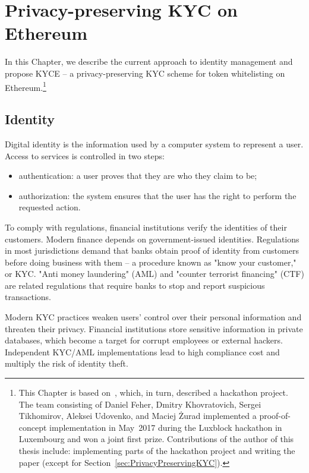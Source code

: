 \chapter{Privacy-preserving KYC on Ethereum}

\label{Chapter12KYC}

In this Chapter, we describe the current approach to identity management and propose KYCE -- a privacy-preserving KYC scheme for token whitelisting on Ethereum.\footnote{This Chapter is based on~\cite{Biryukov2018}, which, in turn, described a hackathon project. The team consisting of Daniel Feher, Dmitry Khovratovich, Sergei Tikhomirov, Aleksei Udovenko, and Maciej \.{Z}urad implemented a proof-of-concept implementation in May~2017 during the Luxblock hackathon in Luxembourg and won a joint first prize. Contributions of the author of this thesis include: implementing parts of the hackathon project and writing the paper (except for Section~\ref{sec:PrivacyPreservingKYC}).}


\section{Identity}

Digital identity is the information used by a computer system to represent a user.
Access to services is controlled in two steps:

\begin{itemize}
	\item authentication: a user proves that they are who they claim to be;
	\item authorization: the system ensures that the user has the right to perform the requested action.
\end{itemize}

To comply with regulations, financial institutions verify the identities of their customers.
Modern finance depends on government-issued identities.
Regulations in most jurisdictions demand that banks obtain proof of identity from customers before doing business with them -- a procedure known as "know your customer," or KYC.
"Anti money laundering" (AML) and "counter terrorist financing" (CTF) are related regulations that require banks to stop and report suspicious transactions.

Modern KYC practices weaken users' control over their personal information and threaten their privacy.
Financial institutions store sensitive information in private databases, which become a target for corrupt employees or external hackers.
Independent KYC/AML implementations lead to high compliance cost and multiply the risk of identity theft.

